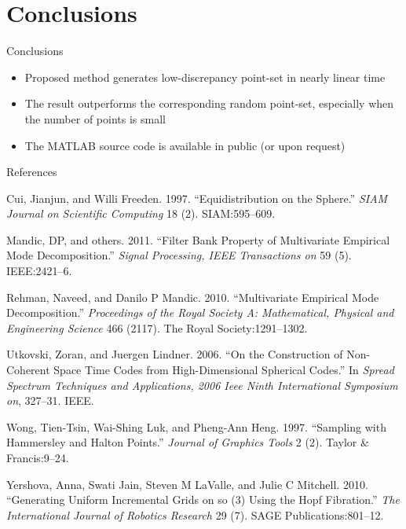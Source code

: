 \documentclass[10pt,ignorenonframetext,serif,onlymath]{beamer}
\begin{document}
\hypertarget{conclusions}{%
\section{Conclusions}\label{conclusions}}

\begin{frame}{Conclusions}
\protect\hypertarget{conclusions-1}{}

\begin{itemize}
\item
  Proposed method generates low-discrepancy point-set in nearly linear
  time
\item
  The result outperforms the corresponding random point-set, especially
  when the number of points is small
\item
  The MATLAB source code is available in public (or upon request)
\end{itemize}

\end{frame}

\begin{frame}[allowframebreaks]{References}
\protect\hypertarget{references}{}

\hypertarget{refs}{}
\leavevmode\hypertarget{ref-cui1997equidistribution}{}%
Cui, Jianjun, and Willi Freeden. 1997. “Equidistribution on the Sphere.”
\emph{SIAM Journal on Scientific Computing} 18 (2). SIAM:595–609.

\leavevmode\hypertarget{ref-mandic2011filter}{}%
Mandic, DP, and others. 2011. “Filter Bank Property of Multivariate
Empirical Mode Decomposition.” \emph{Signal Processing, IEEE
Transactions on} 59 (5). IEEE:2421–6.

\leavevmode\hypertarget{ref-rehman2010multivariate}{}%
Rehman, Naveed, and Danilo P Mandic. 2010. “Multivariate Empirical Mode
Decomposition.” \emph{Proceedings of the Royal Society A: Mathematical,
Physical and Engineering Science} 466 (2117). The Royal
Society:1291–1302.

\leavevmode\hypertarget{ref-utkovski2006construction}{}%
Utkovski, Zoran, and Juergen Lindner. 2006. “On the Construction of
Non-Coherent Space Time Codes from High-Dimensional Spherical Codes.” In
\emph{Spread Spectrum Techniques and Applications, 2006 Ieee Ninth
International Symposium on}, 327–31. IEEE.

\leavevmode\hypertarget{ref-wong1997sampling}{}%
Wong, Tien-Tsin, Wai-Shing Luk, and Pheng-Ann Heng. 1997. “Sampling with
Hammersley and Halton Points.” \emph{Journal of Graphics Tools} 2 (2).
Taylor \& Francis:9–24.

\leavevmode\hypertarget{ref-yershova2010generating}{}%
Yershova, Anna, Swati Jain, Steven M LaValle, and Julie C Mitchell.
2010. “Generating Uniform Incremental Grids on so (3) Using the Hopf
Fibration.” \emph{The International Journal of Robotics Research} 29
(7). SAGE Publications:801–12.

\end{frame}
\end{document}

